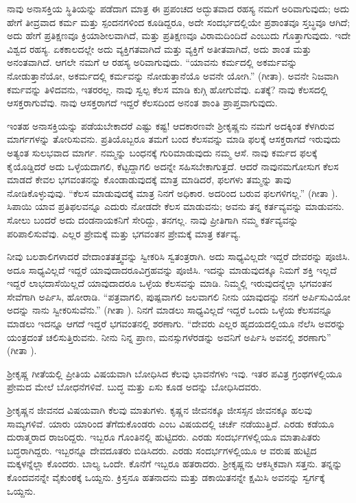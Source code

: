 ನಾವು ಅನಾಸಕ್ತಿಯ ಸ್ಥಿತಿಯನ್ನು ಪಡೆದಾಗ ಮಾತ್ರ ಈ ಪ್ರಪಂಚದ ಅದ್ಭುತವಾದ ರಹಸ್ಯ ನಮಗೆ ಅರಿವಾಗುವುದು; ಅದು ಹೇಗೆ ತೀವ್ರವಾದ ಕರ್ಮ ಮತ್ತು ಸ್ಪಂದನಗಳಿಂದ ಕೂಡಿದ್ದರೂ, ಅದೇ ಸಂದರ್ಭದಲ್ಲಿಯೇ ಪ್ರಶಾಂತವೂ ಸ್ತಬ್ಧವೂ ಆಗಿದೆ; ಅದು ಹೇಗೆ ಪ್ರತಿಕ್ಷಣವೂ ಕ್ರಿಯಾಶೀಲವಾಗಿದೆ, ಮತ್ತು ಪ್ರತಿಕ್ಷಣವೂ ವಿರಾಮದಿಂದಿದೆ ಎಂಬುದು ಗೊತ್ತಾಗುವುದು. ಇದೇ ವಿಶ್ವದ ರಹಸ್ಯ. ಏಕಕಾಲದಲ್ಲೇ ಅದು ವ್ಯಕ್ತಿಗತವಾಗಿದೆ ಮತ್ತು ವ್ಯಕ್ತಿಗೆ ಅತೀತವಾಗಿದೆ, ಅದು ಶಾಂತ ಮತ್ತು ಅನಂತವಾಗಿದೆ. ಆಗಲೇ ನಮಗೆ ಆ ರಹಸ್ಯ ಅರಿವಾಗುವುದು. “ಯಾವನು ಕರ್ಮದಲ್ಲಿ ಅಕರ್ಮವನ್ನು ನೋಡುತ್ತಾನೆಯೋ, ಅಕರ್ಮದಲ್ಲಿ ಕರ್ಮವನ್ನು ನೋಡುತ್ತಾನೆಯೊ ಅವನೇ ಯೋಗಿ.” (ಗೀತಾ). ಅವನೇ ನಿಜವಾಗಿ ಕರ್ಮವನ್ನು ತಿಳಿದವನು, ಇತರರಲ್ಲ. ನಾವು ಸ್ವಲ್ಪ ಕೆಲಸ ಮಾಡಿ ಕುಗ್ಗಿ ಹೋಗುವೆವು. ಏತಕ್ಕೆ? ನಾವು ಕೆಲಸದಲ್ಲಿ ಆಸಕ್ತರಾಗುವೆವು. ನಾವು ಆಸಕ್ತರಾಗದೆ ಇದ್ದರೆ ಕೆಲಸದಿಂದ ಅನಂತ ಶಾಂತಿ ಪ್ರಾಪ್ತವಾಗುವುದು.

ಇಂತಹ ಅನಾಸಕ್ತಿಯನ್ನು ಪಡೆಯಬೇಕಾದರೆ ಎಷ್ಟು ಕಷ್ಟ! ಆದಕಾರಣವೇ ಶ‍್ರೀಕೃಷ್ಣನು ನಮಗೆ ಅದಕ್ಕಿಂತ ಕೆಳಗಿರುವ ಮಾರ್ಗಗಳನ್ನು ತೋರಿಸುವನು. ಪ್ರತಿಯೊಬ್ಬರೂ ತಮಗೆ ಬಂದ ಕೆಲಸವನ್ನು ಮಾಡಿ ಫಲಕ್ಕೆ ಆಸಕ್ತರಾಗದೆ ಇರುವುದು ಅತ್ಯಂತ ಸುಲಭವಾದ ಮಾರ್ಗ. ನಮ್ಮನ್ನು ಬಂಧನಕ್ಕೆ ಗುರಿಮಾಡುವುದು ನಮ್ಮ ಆಸೆ. ನಾವು ಕರ್ಮದ ಫಲಕ್ಕೆ ಕೈಯೊಡ್ಡಿದರೆ ಅದು ಒಳ್ಳೆಯದಾಗಲಿ, ಕೆಟ್ಟದ್ದಾಗಲಿ ಅದನ್ನೇ ಸಹಿಸಬೇಕಾಗುತ್ತದೆ. ಆದರೆ ನಾವು\break ನಮಗೋಸುಗ ಕೆಲಸ ಮಾಡದೆ ಕೇವಲ ಭಗವಂತನನ್ನು ಕೊಂಡಾಡುವುದಕ್ಕೆ ಮಾತ್ರ ಮಾಡಿದರೆ, ಫಲಗಳು ತಮ್ಮನ್ನು ತಾವು ನೋಡಿಕೊಳ್ಳುವುವು. “ಕೆಲಸ ಮಾಡುವುದಕ್ಕೆ ಮಾತ್ರ ನಿನಗೆ ಅಧಿಕಾರ. ಅದರಿಂದ ಬರುವ ಫಲಗಳಿಗಲ್ಲ.” (ಗೀತಾ ). ಸಿಪಾಯಿ ಯಾವ ಪ್ರತಿಫಲವನ್ನೂ ಎದುರು ನೋಡದೇ ಕೆಲಸ ಮಾಡುವನು; ಅವನು ತನ್ನ ಕರ್ತವ್ಯವನ್ನು ಮಾಡುವನು. ಸೋಲು ಬಂದರೆ ಅದು ದಂಡನಾಯಕನಿಗೆ ಸೇರಿದ್ದು, ತನಗಲ್ಲ. ನಾವು ಪ್ರೀತಿಗಾಗಿ ನಮ್ಮ ಕರ್ತವ್ಯವನ್ನು ಪರಿಪಾಲಿಸುವೆವು. ಎಲ್ಲರ ಪ್ರೇಮಕ್ಕೆ ಮತ್ತು ಭಗವಂತನ ಪ್ರೇಮಕ್ಕೆ ಮಾತ್ರ ಕರ್ತವ್ಯ.

ನೀವು ಬಲಶಾಲಿಗಳಾದರೆ ವೇದಾಂತತತ್ತ್ವವನ್ನು ಸ್ವೀಕರಿಸಿ ಸ್ವತಂತ್ರರಾಗಿ. ಅದು ಸಾಧ್ಯವಿಲ್ಲದೇ ಇದ್ದರೆ ದೇವರನ್ನು ಪೂಜಿಸಿ. ಅದೂ ಸಾಧ್ಯವಿಲ್ಲದೆ ಇದ್ದರೆ ಯಾವುದಾದರೂ\break ವಿಗ್ರಹವನ್ನು ಪೂಜಿಸಿ. ಇದನ್ನು ಮಾಡುವುದಕ್ಕೂ ನಿಮಗೆ ಶಕ್ತಿ ಇಲ್ಲದೆ ಇದ್ದರೆ ಲಾಭದಾಸೆಯಿಲ್ಲದೆ ಯಾವುದಾದರೂ ಒಳ್ಳೆಯ ಕೆಲಸವನ್ನು ಮಾಡಿ. ನಿಮ್ಮಲ್ಲಿ ಇರುವುದನ್ನೆಲ್ಲಾ ಭಗವಂತನ ಸೇವೆಗಾಗಿ ಅರ್ಪಿಸಿ, ಹೋರಾಡಿ. “ಪತ್ರವಾಗಲಿ, ಪುಷ್ಪವಾಗಲಿ ಜಲವಾಗಲಿ ನೀನು ಯಾವುದನ್ನು ನನಗೆ ಅರ್ಪಿಸುವಿಯೋ ಅದನ್ನು ನಾನು ಸ್ವೀಕರಿಸುವೆನು.” (ಗೀತಾ ). ನಿನಗೆ ಮಾಡಲು ಸಾಧ್ಯವಿಲ್ಲದೆ ಇದ್ದರೆ ಒಂದು ಒಳ್ಳೆಯ ಕೆಲಸವನ್ನೂ ಮಾಡಲು ಇದನ್ನೂ ಆಗದೆ ಇದ್ದರೆ ಭಗವಂತನಲ್ಲಿ ಶರಣಾಗು. “ದೇವರು ಎಲ್ಲರ ಹೃದಯದಲ್ಲಿಯೂ ನೆಲೆಸಿ ಅವರನ್ನು ಯಂತ್ರದಂತೆ ಚಲಿಸುತ್ತಿರುವನು. ನೀನು ನಿನ್ನ ಪ್ರಾಣ, ಮನಸ್ಸುಗಳೆರ\-ಡನ್ನು ಅವನಿಗೆ ಅರ್ಪಿಸಿ ಅವನಲ್ಲಿ ಶರಣಾಗು” (ಗೀತಾ ).

ಶ‍್ರೀಕೃಷ್ಣ ಗೀತೆಯಲ್ಲಿ ಪ್ರೀತಿಯ ವಿಷಯವಾಗಿ ಬೋಧಿಸಿದ ಕೆಲವು ಭಾವನೆಗಳು ಇವು. ಇತರ ಪವಿತ್ರ ಗ್ರಂಥಗಳಲ್ಲಿಯೂ ಪ್ರೇಮದ ಮೇಲೆ ಬೋಧನೆಗಳಿವೆ. ಬುದ್ಧ ಮತ್ತು ಏಸು ಕೂಡ ಅದನ್ನು ಬೋಧಿಸಿದವರು.

ಶ‍್ರೀಕೃಷ್ಣನ ಜೀವನದ ವಿಷಯವಾಗಿ ಕೆಲವು ಮಾತುಗಳು. ಕೃಷ್ಣನ ಜೀವನಕ್ಕೂ ಜೀಸಸ್ಸನ ಜೀವನಕ್ಕೂ ಹಲವು ಸಾಮ್ಯಗಳಿವೆ. ಯಾರು ಯಾರಿಂದ ತೆಗೆದುಕೊಂಡರು ಎಂಬ ವಿಷಯ\-ದಲ್ಲಿ ಚರ್ಚೆ ನಡೆಯುತ್ತಿದೆ. ಎರಡು ಕಡೆಯೂ ದುರಾತ್ಮರಾದ ರಾಜರಿದ್ದರು. ಇಬ್ಬರೂ ಗೊಂತಿನಲ್ಲಿ ಹುಟ್ಟಿದರು. ಎರಡು ಸಂದರ್ಭಗಳಲ್ಲಿಯೂ ಮಾತಾಪಿತರು ಬದ್ಧರಾಗಿದ್ದರು. ಇಬ್ಬರನ್ನೂ ದೇವದೂತರು ಬಿಡಿಸಿದರು. ಎರಡು ಸಂದರ್ಭಗಳಲ್ಲಿಯೂ ಆ ವರುಷ ಹುಟ್ಟಿದ ಮಕ್ಕಳನ್ನೆಲ್ಲಾ ಕೊಂದರು. ಬಾಲ್ಯ ಒಂದೇ. ಕೊನೆಗೆ ಇಬ್ಬರೂ ಹತರಾದರು. ಶ‍್ರೀಕೃಷ್ಣನು ಆಕಸ್ಮಿಕವಾಗಿ ಸತ್ತನು. ತನ್ನನ್ನು ಕೊಂದವನನ್ನೇ ವೈಕುಂಠಕ್ಕೆ ಒಯ್ದನು. ಕ್ರಿಸ್ತನೂ ಹತನಾದನು ಮತ್ತು ಡಕಾಯಿತನನ್ನೇ ಕ್ಷಮಿಸಿ ಅವನನ್ನು ಸ್ವರ್ಗಕ್ಕೆ ಒಯ್ದನು.


